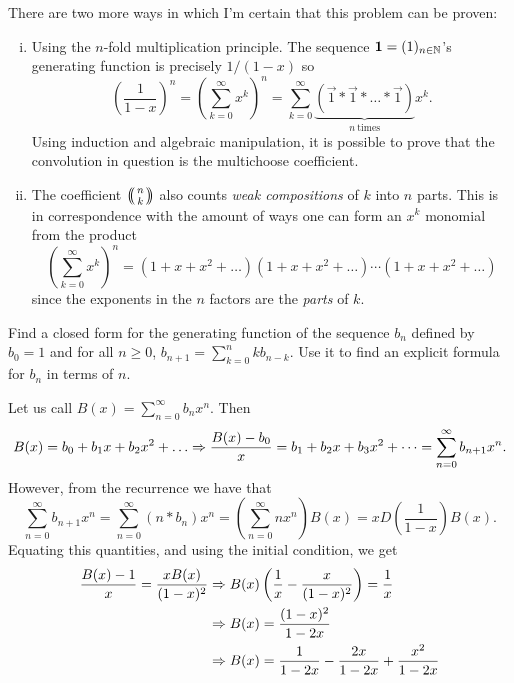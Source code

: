 \documentclass[12pt]{memoir}
\begin{document}
There are two more ways in which I'm certain that this problem can be proven:
\begin{enumerate}[i)]
    \itemsep=-0.4em 
    \item Using the $n$-fold multiplication principle. The sequence $\mathbf{1}=(1)_{n\in\mathbb{N}}$'s generating function is precisely $1/(1-x)$ so 
    $$\left(\frac{1}{1-x}\right)^n=\left(\sum_{k=0}^\infty x^k\right)^n=\sum_{k=0}^\infty \underbrace{(\vec{1}\ast\vec{1}\ast\dots\ast\vec{1})}_{n\ \text{times}}x^k.$$
    Using induction and algebraic manipulation, it is possible to prove that the convolution in question is the multichoose coefficient.
    \item The coefficient $\multinom{n}{k}$ also counts \emph{weak compositions} of $k$ into $n$ parts. This is in correspondence with the amount of ways one can form an $x^k$ monomial from the product
    $$\left(\sum_{k=0}^\infty x^k\right)^n=(1+x+x^2+\dots)(1+x+x^2+\dots)\cdots(1+x+x^2+\dots)$$
    since the exponents in the $n$ factors are the \emph{parts} of $k$.
\end{enumerate}

\begin{Ej}[Exercise 6]
    Find a closed form for the generating function of the sequence $b_n$ defined by $b_0=1$ and for all $n\geq 0$, $b_{n+1}=\sum_{k=0}^nkb_{n-k}$. Use it to find an explicit formula for $b_n$ in terms of $n$.
\end{Ej}

\begin{ptcbr}
Let us call $B(x)=\sum_{n=0}^\infty b_nx^n$. Then 
$$B(x)=b_0+b_1x+b_2x^2+\dots\To \frac{B(x)-b_0}{x}=b_1+b_2x+b_3x^2+\dots=\sum_{n=0}^\infty b_{n+1}x^n.$$
However, from the recurrence we have that 
$$\sum_{n=0}^\infty b_{n+1}x^n=\sum_{n=0}^\infty (n\ast b_n)x^n=\left(\sum_{n=0}^\infty nx^n\right)B(x)=xD\left(\frac{1}{1-x}\right)B(x).$$
Equating this quantities, and using the initial condition, we get
\begin{align*}
    \frac{B(x)-1}{x}=\frac{xB(x)}{(1-x)^2}&\Rightarrow B(x)\left(\frac{1}{x}-\frac{x}{(1-x)^2}\right)=\frac{1}{x}\\
    &\Rightarrow B(x)=\frac{(1-x)^2}{1-2x}\\
    &\Rightarrow B(x)=\frac{1}{1-2x}-\frac{2x}{1-2x}+\frac{x^2}{1-2x}
\end{align*}\end{ptcbr}
\end{document}
